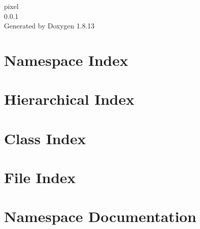 \documentclass[twoside]{book}
\newcommand{\+}{\discretionary{\mbox{\scriptsize$\hookleftarrow$}}{}{}}
\newcommand{\clearemptydoublepage}{%
  \newpage{\pagestyle{empty}\cleardoublepage}%
}
\begin{document}
\hypersetup{pageanchor=false,
             bookmarksnumbered=true,
             pdfencoding=unicode
            }
\begin{titlepage}
\vspace*{7cm}
\begin{center}%
{\Large pixel \\[1ex]\large 0.\+0.\+1 }\\
\vspace*{1cm}
{\large Generated by Doxygen 1.8.13}\\
\end{center}
\end{titlepage}
\clearemptydoublepage
{}
\tableofcontents
\clearemptydoublepage
{}
\hypersetup{pageanchor=true}

\chapter{Namespace Index}

\chapter{Hierarchical Index}

\chapter{Class Index}

\chapter{File Index}

\chapter{Namespace Documentation}












\end{document}
